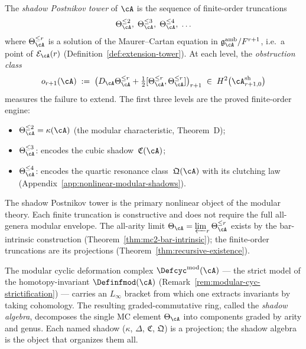 \begin{definition}
\label{def:shadow-postnikov-tower}
\ClaimStatusProvedHere
{}
The \emph{shadow Postnikov tower} of $\cA$ is the sequence of
finite-order truncations
\begin{equation}
\label{eq:shadow-postnikov-tower}
\Theta_{\cA}^{\leq 2},\;
\Theta_{\cA}^{\leq 3},\;
\Theta_{\cA}^{\leq 4},\;
\ldots
\end{equation}
where $\Theta_{\cA}^{\leq r}$ is a solution
of the Maurer--Cartan equation in
$\mathfrak{g}^{\mathrm{amb}}_{\cA}/F^{r+1}$,
i.e.\ a point of $\mathcal{E}_{\cA}(r)$
(Definition~\ref{def:extension-tower}).
At each level, the \emph{obstruction class}
\begin{equation}
\label{eq:obstruction-class}
o_{r+1}(\cA)
\;:=\;
\bigl(
D_{\cA}\Theta_{\cA}^{\leq r}
+ \tfrac12[\Theta_{\cA}^{\leq r},\Theta_{\cA}^{\leq r}]
\bigr)_{r+1}
\;\in\;
H^2\bigl(\cA^{\mathrm{sh}}_{r+1,0}\bigr)
\end{equation}
measures the failure to extend.  The first three levels
are the proved finite-order engine:
\begin{itemize}
\item $\Theta_{\cA}^{\leq 2} = \kappa(\cA)$
  \quad(the modular characteristic, Theorem~D);
\item $\Theta_{\cA}^{\leq 3}$: encodes the cubic
  shadow~$\mathfrak{C}(\cA)$;
\item $\Theta_{\cA}^{\leq 4}$: encodes the quartic resonance
  class~$\mathfrak{Q}(\cA)$ with its clutching law
  (Appendix~\ref{app:nonlinear-modular-shadows}).
\end{itemize}
The shadow Postnikov tower is the primary nonlinear object of
the modular theory.  Each finite truncation is constructive and
does not require the full all-genera modular envelope.  The
all-arity limit
$\Theta_{\cA} = \varprojlim_r \Theta_{\cA}^{\leq r}$
exists by the bar-intrinsic construction
(Theorem~\ref{thm:mc2-bar-intrinsic}); the finite-order
truncations are its projections
(Theorem~\ref{thm:recursive-existence}).
\end{definition}

The modular cyclic deformation complex
$\Defcyc^{\mathrm{mod}}(\cA)$ --- the strict model of the
homotopy-invariant $\Definfmod(\cA)$
(Remark~\ref{rem:modular-cyc-strictification}) --- carries an
$L_\infty$ bracket from which one extracts invariants by taking
cohomology.  The resulting graded-commutative ring, called the
\emph{shadow algebra}, decomposes the single MC element
$\Theta_\cA$ into components graded by arity and genus.  Each named
shadow ($\kappa$, $\Delta$, $\mathfrak{C}$, $\mathfrak{Q}$) is a
projection; the shadow algebra is the object that organizes them all.

